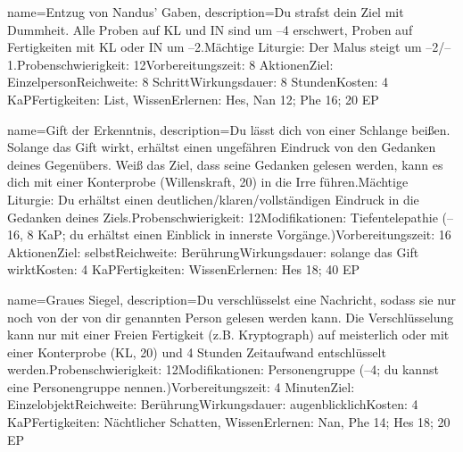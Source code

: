 {
    name={Entzug von Nandus' Gaben},
    description={Du strafst dein Ziel mit Dummheit. Alle Proben auf KL und IN sind um –4 erschwert, Proben auf Fertigkeiten mit KL oder IN um –2.\newline Mächtige Liturgie: Der Malus steigt um –2/–1.\newline Probenschwierigkeit: 12\newline Vorbereitungszeit: 8 Aktionen\newline Ziel: Einzelperson\newline Reichweite: 8 Schritt\newline Wirkungsdauer: 8 Stunden\newline Kosten: 4 KaP\newline Fertigkeiten: List, Wissen\newline Erlernen: Hes, Nan 12; Phe 16; 20 EP}
}


{
    name={Gift der Erkenntnis},
    description={Du lässt dich von einer Schlange beißen. Solange das Gift wirkt, erhältst einen ungefähren Eindruck von den Gedanken deines Gegenübers. Weiß das Ziel, dass seine Gedanken gelesen werden, kann es dich mit einer Konterprobe (Willenskraft, 20) in die Irre führen.\newline Mächtige Liturgie: Du erhältst einen deutlichen/klaren/vollständigen Eindruck in die Gedanken deines Ziels.\newline Probenschwierigkeit: 12\newline Modifikationen: Tiefentelepathie (–16, 8 KaP; du erhältst einen Einblick in innerste Vorgänge.)\newline Vorbereitungszeit: 16 Aktionen\newline Ziel: selbst\newline Reichweite: Berührung\newline Wirkungsdauer: solange das Gift wirkt\newline Kosten: 4 KaP\newline Fertigkeiten: Wissen\newline Erlernen: Hes 18; 40 EP}
}


{
    name={Graues Siegel},
    description={Du verschlüsselst eine Nachricht, sodass sie nur noch von der von dir genannten Person gelesen werden kann. Die Verschlüsselung kann nur mit einer Freien Fertigkeit (z.B. Kryptograph) auf meisterlich oder mit einer Konterprobe (KL, 20) und 4 Stunden Zeitaufwand entschlüsselt werden.\newline Probenschwierigkeit: 12\newline Modifikationen: Personengruppe (–4; du kannst eine Personengruppe nennen.)\newline Vorbereitungszeit: 4 Minuten\newline Ziel: Einzelobjekt\newline Reichweite: Berührung\newline Wirkungsdauer: augenblicklich\newline Kosten: 4 KaP\newline Fertigkeiten: Nächtlicher Schatten, Wissen\newline Erlernen: Nan, Phe 14; Hes 18; 20 EP}
}


